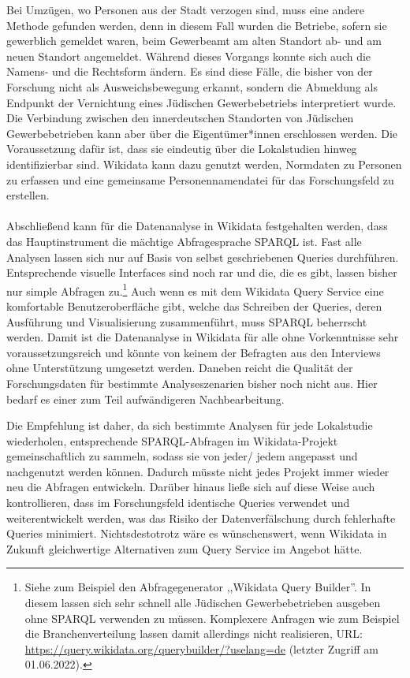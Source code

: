 Bei Umzügen, wo Personen aus der Stadt verzogen sind, muss eine andere Methode gefunden werden, denn in diesem Fall wurden die Betriebe, sofern sie gewerblich gemeldet waren, beim Gewerbeamt am alten Standort ab- und am neuen Standort angemeldet. Während dieses Vorgangs konnte sich auch die Namens- und die Rechtsform ändern. Es sind diese Fälle, die bisher von der Forschung nicht als Ausweichsbewegung erkannt, sondern die Abmeldung als Endpunkt der Vernichtung eines Jüdischen Gewerbebetriebs interpretiert wurde. Die Verbindung zwischen den innerdeutschen Standorten von Jüdischen Gewerbebetrieben kann aber über die Eigentümer*innen erschlossen werden. Die Voraussetzung dafür ist, dass sie eindeutig über die Lokalstudien hinweg identifizierbar sind. Wikidata kann dazu genutzt werden, Normdaten zu Personen zu erfassen und eine gemeinsame Personennamendatei für das Forschungsfeld zu erstellen. \\ \\
Abschließend kann für die Datenanalyse in Wikidata festgehalten werden, dass das Hauptinstrument die mächtige Abfragesprache SPARQL ist. Fast alle Analysen lassen sich nur auf Basis von selbst geschriebenen Queries durchführen. Entsprechende visuelle Interfaces sind noch rar und die, die es gibt, lassen bisher nur simple Abfragen zu.\footnote{Siehe zum Beispiel den Abfragegenerator ,,Wikidata Query Builder''. In diesem lassen sich sehr schnell alle Jüdischen Gewerbebetrieben ausgeben ohne SPARQL verwenden zu müssen. Komplexere Anfragen wie zum Beispiel die Branchenverteilung lassen damit allerdings nicht realisieren, URL: \url{https://query.wikidata.org/querybuilder/?uselang=de} (letzter Zugriff am 01.06.2022).} Auch wenn es mit dem Wikidata Query Service eine komfortable Benutzeroberfläche gibt, welche das Schreiben der Queries, deren Ausführung und Visualisierung zusammenführt, muss SPARQL beherrscht werden. Damit ist die Datenanalyse in Wikidata für alle ohne Vorkenntnisse sehr voraussetzungsreich und könnte von keinem der Befragten aus den Interviews ohne Unterstützung umgesetzt werden. Daneben reicht die Qualität der Forschungsdaten für bestimmte Analyseszenarien bisher noch nicht aus. Hier bedarf es einer zum Teil aufwändigeren Nachbearbeitung.

Die Empfehlung ist daher, da sich bestimmte Analysen für jede Lokalstudie wiederholen, entsprechende SPARQL-Abfragen im Wikidata-Projekt gemeinschaftlich zu sammeln, sodass sie von jeder/ jedem angepasst und nachgenutzt werden können. Dadurch müsste nicht jedes Projekt immer wieder neu die Abfragen entwickeln. Darüber hinaus ließe sich auf diese Weise auch kontrollieren, dass im Forschungsfeld identische Queries verwendet und weiterentwickelt werden, was das Risiko der Datenverfälschung durch fehlerhafte Queries minimiert. Nichtsdestotrotz wäre es wünschenswert, wenn Wikidata in Zukunft gleichwertige Alternativen zum Query Service im Angebot hätte.
  
